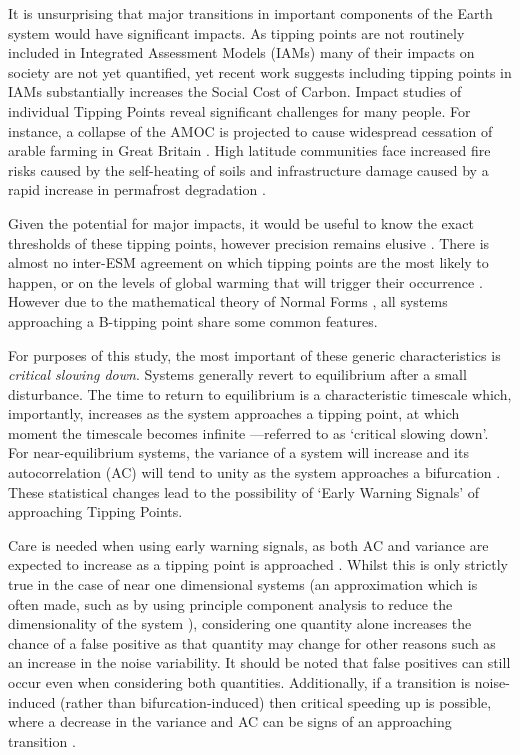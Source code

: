 It is unsurprising that major transitions in important components
of the Earth system would have significant impacts. As tipping points
are not routinely included in Integrated Assessment Models (IAMs) many of 
their impacts on society are not yet quantified, yet recent 
work \parencite{Dietz2021}
suggests including tipping points in IAMs
substantially increases the Social Cost 
of Carbon. Impact studies of individual 
Tipping Points reveal significant challenges for many people. For instance, a 
collapse of the AMOC is projected to cause
widespread cessation of arable farming in Great Britain \parencite{Ritchie2020a}.
High latitude communities face increased fire risks caused 
by the self-heating of soils \parencite{Clarke2021} and infrastructure damage 
caused by a rapid increase in permafrost degradation \parencite{Teufel2019}. 


Given the potential for major impacts, it would be useful to know the exact thresholds of
these tipping points, however precision remains elusive \parencite{Steffen2018}.
There is almost no inter-ESM
agreement on which tipping points are the most likely to happen, or on the
levels of global warming that will trigger their
occurrence \parencite{Drijfhout2015}.
However due to the mathematical theory of Normal 
Forms \parencite{Strogatz2015,guckenheimer2013}, all systems approaching a
B-tipping point share some common features.

For purposes of this study, the most important of these generic characteristics
is \emph{critical slowing down}. Systems generally revert to  equilibrium after a small disturbance. 
The time to return to equilibrium is a characteristic timescale which, importantly, increases as the system 
approaches a tipping point, at which moment the timescale becomes 
infinite \parencite{Scheffer2012}---referred to as `critical slowing down'. 
For near-equilibrium systems, the variance of a system will increase and its autocorrelation (AC)
will tend to unity as the system approaches a bifurcation \parencite{Scheffer2009,Held2004}.
These statistical changes lead to the possibility of `Early Warning Signals' of approaching Tipping Points.

Care is needed when using early warning signals, as
both AC and variance are expected to increase as a tipping point is 
approached \parencite{Ditlevsen2010}. Whilst this is only strictly true
in the case of near one dimensional systems (an approximation which is often made, such as by using principle component analysis to reduce the 
dimensionality of the system \parencite{Held2004}), considering one quantity alone 
increases the chance of a false positive as that quantity may change for other reasons such as an increase in the noise variability. It should 
be noted that false positives can still occur even when considering 
both quantities.
Additionally, if a transition is noise-induced (rather than bifurcation-induced) then critical speeding up is possible, where
a decrease in the variance and AC can be signs of an approaching transition \parencite{Titus2020}.

